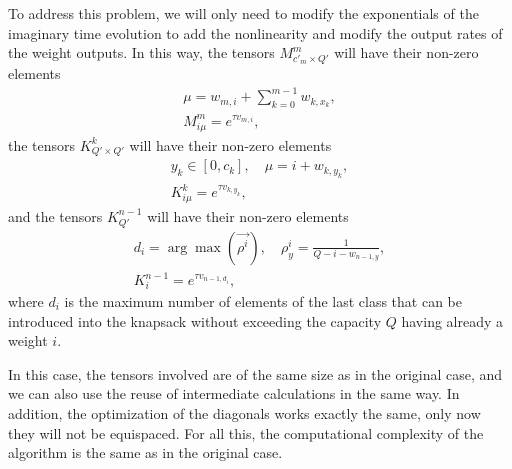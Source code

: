 To address this problem, we will only need to modify the exponentials of the imaginary time evolution to add the nonlinearity and modify the output rates of the weight outputs. In this way, the tensors $M^m_{c'_m\times Q'}$ will have their non-zero elements
\begin{equation}
    \begin{gathered}
    \mu=w_{m,i} + \sum_{k=0}^{m-1}w_{k,x_k}, \\
    M^{m}_{i\mu}=e^{\tau v_{m,i}},
    \end{gathered}
\end{equation}
the tensors $K^k_{Q'\times Q'}$ will have their non-zero elements
\begin{equation}
    \begin{gathered}
    y_k \in [0,c_k], \quad \mu=i+w_{k,y_k}, \\
    K^{k}_{i\mu}=e^{\tau v_{k,y_k}},
    \end{gathered}
\end{equation}
and the tensors $K^{n-1}_{Q'}$  will have their non-zero elements
\begin{equation}
    \begin{gathered}
    d_{i}=\arg\max(\vec{\rho^{i}}),\quad \rho^{i}_{y} = \frac{1}{Q-i-w_{n-1,y}}, \\
    K^{n-1}_{i}=e^{\tau v_{n-1,d_i}}, 
    \end{gathered}
\end{equation}
where $d_i$ is the maximum number of elements of the last class that can be introduced into the knapsack without exceeding the capacity $Q$ having already a weight $i$.

In this case, the tensors involved are of the same size as in the original case, and we can also use the reuse of intermediate calculations in the same way. In addition, the optimization of the diagonals works exactly the same, only now they will not be equispaced. For all this, the computational complexity of the algorithm is the same as in the original case.

